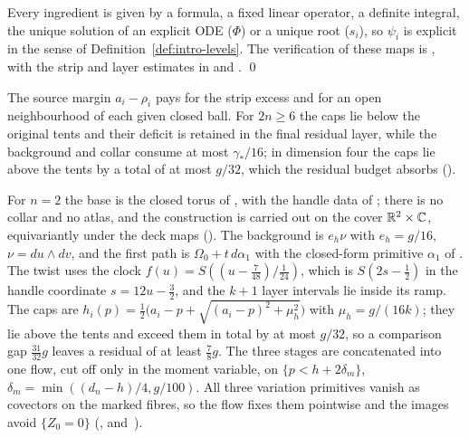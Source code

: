 Every ingredient is given by a formula, a fixed linear operator, a definite integral, the unique solution of an explicit ODE
($\Phi$) or a unique root ($s_i$), so $\psi_i$ is explicit in the sense of Definition~\ref{def:intro-levels}.
The verification of these maps is , with the strip and
layer estimates in  and . \qed

The source margin $a_i-\rho_i$ pays for the strip excess and for an open neighbourhood of each given
closed ball. For $2n\ge6$ the caps lie below the original tents and their deficit is retained in the final residual
layer, while the background and collar consume at most $\gamma_*/16$; in dimension four the caps lie above the tents
by a total of at most $g/32$, which the residual budget absorbs ().

\begin{remark}\label{rem:hdl-four}
For $n=2$ the base is the closed torus of , with the handle data of
; there is no collar and no atlas, and the construction is carried out on the cover
$\mathbb{R}^2\times\mathbb{C}$, equivariantly under the deck maps (). The background is $e_h\nu$ with $e_h=g/16$,
$\nu=du\wedge dv$, and the first path is $\Omega_0+t\,d\alpha_1$ with the closed-form primitive $\alpha_1$ of
. The twist uses the clock $f(u)=S((u-\frac7{48})/\frac1{24})$, which is
$S(2s-\frac12)$ in the handle coordinate $s=12u-\frac32$, and the $k+1$ layer intervals lie inside its ramp. The caps are $h_i(p)=\frac12\bigl(a_i-p+\sqrt{(a_i-p)^2+\mu_h^2}\bigr)$ with
$\mu_h=g/(16k)$; they lie above the tents and exceed them in total by at most $g/32$, so a comparison gap
$\frac{31}{32}g$ leaves a residual of at least $\frac78g$. The three stages are concatenated into one flow, cut off
only in the moment variable, on $\{p<h+2\delta_m\}$, $\delta_m=\min((d_n-h)/4,g/100)$. All three variation
primitives vanish as covectors on the marked fibres, so the flow fixes them pointwise and the images avoid
$\{Z_0=0\}$ (,  and~).
\end{remark}
